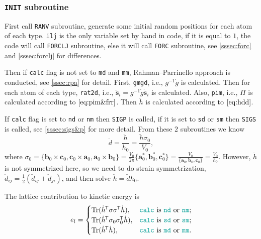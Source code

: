 
\subsubsection{\texttt{INIT} subroutine}
\label{sssec:init}

First call \texttt{RANV} subroutine,
generate some initial random positions for each atom of each type.
\texttt{ilj} is the only variable set by hand in code, if it is equal to $1$,
the code will call \texttt{FORCLJ} subroutine, else it will call \texttt{FORC}
subroutine, see \ref{sssec:forc} and \ref{sssec:forclj} for differences.

Then if \texttt{calc} flag is not set to \texttt{md} and \texttt{mm},
Rahman--Parrinello approach is conducted, see \ref{ssec:rpa} for detail.
First, \texttt{gmgd}, i.e., $g^{-1} \dot{g}$ is calculated.
Then for each atom of each type,
\texttt{rat2d}, i.e., $\ddot{\bm{s}}_i = g^{-1} \dot{g} \dot{ \bm{s} }_i$ is calculated.
Also, \texttt{pim}, i.e., $\Pi$ is calculated according to $\eqref{eq:pim&frr}$.
Then $\ddot{h}$ is calculated according to $\eqref{eq:hdd}$.

If \texttt{calc} flag is set to \texttt{nd} or \texttt{nm}
then \texttt{SIGP} is called, if it is set to \texttt{sd} or
\texttt{sm} then \texttt{SIGS} is called, see \ref{sssec:sigs&p}
for more detail.
From these $2$ subroutines we know
\begin{equation}
	\ddot{d} = \frac{ \ddot{h} }{ h_0 } = \frac{ \ddot{h} \sigma_0}{V_0},
\end{equation}
where
$\sigma_0 =
\{
\bm{b}_0 \times \bm{c}_0, \bm{c}_0 \times \bm{a}_0,
\bm{a}_0 \times \bm{b}_0
\}
= \frac{ V_0 }{ 2\pi } \{
\bm{a}^\ast_0, \bm{b}^\ast_0, \bm{c}^\ast_0
\} = \frac{ V_0 }{ \{\bm{a}_0, \bm{b}_0, \bm{c}_0 \} } = \frac{ V_0 }{ h_0 }$.
However, $\ddot{h}$ is not symmetrized here, so we need to do
strain symmetrization, $\ddot{d}_{ij} = \frac{ 1 }{ 2 }
(\ddot{d}_{ij} + \ddot{d}_{ji})$, and then solve
$\ddot{h} = \ddot{d} h_0$.

The lattice contribution to kinetic energy is
\begin{equation}\label{eq:calc}
	e_l = 
	\begin{cases}
		\Tr (\dot{h}\tran \sigma \sigma\tran \dot{h}),      & \text{\texttt{calc} is \texttt{nd} or \texttt{nm};} \\
		\Tr(\dot{h}\tran \sigma_0 \sigma_0\tran \dot{ h }), & \text{\texttt{calc} is \texttt{sd} or \texttt{sm};} \\
		\Tr(\dot{h}\tran \dot{ h }),                        & \text{\texttt{calc} is \texttt{md} or \texttt{mm}.} 
	\end{cases}
\end{equation}

